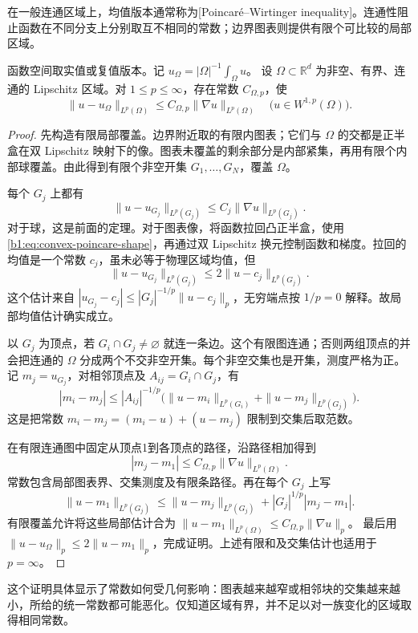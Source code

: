 在一般连通区域上，均值版本通常称为[Poincaré--Wirtinger inequality]。连通性阻止函数在不同分支上分别取互不相同的常数；边界图表则提供有限个可比较的局部区域。

\begin{theorem}\label{b1:thm:connected-domain-poincare}
函数空间取实值或复值版本。记 \(u_\Omega=|\Omega|^{-1}\int_\Omega u\)。
设 \(\Omega\subset\mathbb R^d\) 为非空、有界、连通的 Lipschitz 区域。对 \(1\le p\le\infty\)，存在常数 \(C_{\Omega,p}\)，使
\[
 \|u-u_\Omega\|_{L^p(\Omega)}
 \le C_{\Omega,p}\|\nabla u\|_{L^p(\Omega)}
 \quad\bigl(u\in W^{1,p}(\Omega)\bigr).
\]
\end{theorem}
\begin{proof}
先构造有限局部覆盖。边界附近取的有限内图表；它们与 \(\Omega\) 的交都是正半盒在双 Lipschitz 映射下的像。图表未覆盖的剩余部分是内部紧集，再用有限个内部球覆盖。由此得到有限个非空开集 \(G_1,\ldots,G_N\)，覆盖 \(\Omega\)。

每个 \(G_j\) 上都有
\[
 \|u-u_{G_j}\|_{L^p(G_j)}
 \le C_j\|\nabla u\|_{L^p(G_j)}.
\]
对于球，这是前面的定理。对于图表像，将函数拉回凸正半盒，使用\eqref{b1:eq:convex-poincare-shape}，再通过双 Lipschitz 换元控制函数和梯度。拉回的均值是一个常数 \(c_j\)，虽未必等于物理区域均值，但
\[
 \|u-u_{G_j}\|_{L^p(G_j)}
 \le2\|u-c_j\|_{L^p(G_j)}.
\]
这个估计来自
\(|u_{G_j}-c_j|\le |G_j|^{-1/p}\|u-c_j\|_p\)，无穷端点按 \(1/p=0\) 解释。故局部均值估计确实成立。

以 \(G_j\) 为顶点，若 \(G_i\cap G_j\ne\varnothing\) 就连一条边。这个有限图连通；否则两组顶点的并会把连通的 \(\Omega\) 分成两个不交非空开集。每个非空交集也是开集，测度严格为正。记 \(m_j=u_{G_j}\)，对相邻顶点及 \(A_{ij}=G_i\cap G_j\)，有
\[
 |m_i-m_j|
 \le |A_{ij}|^{-1/p}
       \bigl(\|u-m_i\|_{L^p(G_i)}
              +\|u-m_j\|_{L^p(G_j)}\bigr).
\]
这是把常数 \(m_i-m_j=(m_i-u)+(u-m_j)\) 限制到交集后取范数。

在有限连通图中固定从顶点1到各顶点的路径，沿路径相加得到
\[
 |m_j-m_1|\le C_{\Omega,p}\|\nabla u\|_{L^p(\Omega)}.
\]
常数包含局部图表界、交集测度及有限条路径。再在每个 \(G_j\) 上写
\[
 \|u-m_1\|_{L^p(G_j)}
 \le\|u-m_j\|_{L^p(G_j)}+|G_j|^{1/p}|m_j-m_1|.
\]
有限覆盖允许将这些局部估计合为
\(\|u-m_1\|_{L^p(\Omega)}\le C_{\Omega,p}\|\nabla u\|_p\)。
最后用
\(\|u-u_\Omega\|_p\le2\|u-m_1\|_p\)，完成证明。上述有限和及交集估计也适用于 \(p=\infty\)。
\end{proof}

这个证明具体显示了常数如何受几何影响：图表越来越窄或相邻块的交集越来越小，所给的统一常数都可能恶化。仅知道区域有界，并不足以对一族变化的区域取得相同常数。

